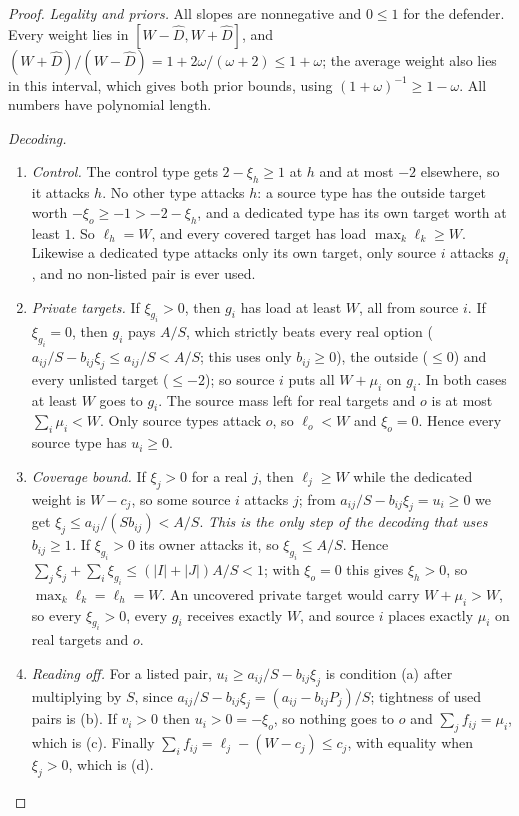 \begin{proof}
\emph{Legality and priors.} All slopes are nonnegative and $0\le1$ for the defender. Every weight lies
in $[W-\hat D,W+\hat D]$, and $(W+\hat D)/(W-\hat D)=1+2\omega/(\omega+2)\le1+\omega$; the average
weight also lies in this interval, which gives both prior bounds, using $(1+\omega)^{-1}\ge1-\omega$.
All numbers have polynomial length.

\emph{Decoding.}
\begin{enumerate}[nosep,label=\arabic*.]
\item \emph{Control.} The control type gets $2-\xi_h\ge1$ at $h$ and at most $-2$ elsewhere, so it
attacks $h$. No other type attacks $h$: a source type has the outside target worth
$-\xi_o\ge-1>-2-\xi_h$, and a dedicated type has its own target worth at least $1$. So $\ell_h=W$, and
every covered target has load $\max_k\ell_k\ge W$. Likewise a dedicated type attacks only its own
target, only source $i$ attacks $g_i$, and no non-listed pair is ever used.
\item \emph{Private targets.} If $\xi_{g_i}>0$, then $g_i$ has load at least $W$, all from source $i$.
If $\xi_{g_i}=0$, then $g_i$ pays $A/S$, which strictly beats every real option
($a_{ij}/S-b_{ij}\xi_j\le a_{ij}/S<A/S$; this uses only $b_{ij}\ge0$), the outside ($\le0$) and every
unlisted target ($\le-2$); so source $i$ puts all $W+\mu_i$ on $g_i$. In both cases at least $W$ goes to
$g_i$. The source mass left for real targets and $o$ is at most $\sum_i\mu_i<W$. Only source types
attack $o$, so $\ell_o<W$ and $\xi_o=0$. Hence every source type has $u_i\ge0$.
\item \emph{Coverage bound.} If $\xi_j>0$ for a real $j$, then $\ell_j\ge W$ while the dedicated weight
is $W-c_j$, so some source $i$ attacks $j$; from $a_{ij}/S-b_{ij}\xi_j=u_i\ge0$ we get
$\xi_j\le a_{ij}/(Sb_{ij})<A/S$. \emph{This is the only step of the decoding that uses $b_{ij}\ge1$.}
If $\xi_{g_i}>0$ its owner attacks it, so $\xi_{g_i}\le A/S$. Hence
$\sum_j\xi_j+\sum_i\xi_{g_i}\le(|I|+|J|)A/S<1$; with $\xi_o=0$ this gives $\xi_h>0$, so
$\max_k\ell_k=\ell_h=W$. An uncovered private target would carry $W+\mu_i>W$, so every $\xi_{g_i}>0$,
every $g_i$ receives exactly $W$, and source $i$ places exactly $\mu_i$ on real targets and $o$.
\item \emph{Reading off.} For a listed pair, $u_i\ge a_{ij}/S-b_{ij}\xi_j$ is condition (a) after
multiplying by $S$, since $a_{ij}/S-b_{ij}\xi_j=(a_{ij}-b_{ij}P_j)/S$; tightness of used pairs is (b).
If $v_i>0$ then $u_i>0=-\xi_o$, so nothing goes to $o$ and $\sum_jf_{ij}=\mu_i$, which is (c). Finally
$\sum_if_{ij}=\ell_j-(W-c_j)\le c_j$, with equality when $\xi_j>0$, which is (d).
\end{enumerate}


\end{proof}
